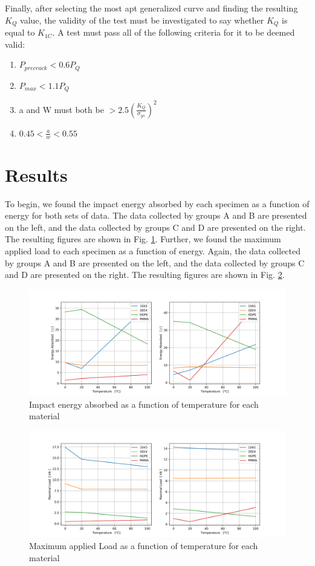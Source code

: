 \documentclass{article}
\begin{document}
Finally, after selecting the most apt generalized curve and finding the resulting $K_Q$ value, the validity of the test must be investigated to say whether $K_Q$ is equal to $K_{1C}$. A test must pass all of the following criteria for it to be deemed valid:

\begin{enumerate}
\label{enum:constraints}
    \item $P_{precrack} < 0.6 P_Q$
    \item $P_{max} < 1.1 P_Q$
    \item a and W must both be $> 2.5 \left(\frac{K_Q}{\sigma_{ys}}\right)^2$
    \item $0.45 < \frac{a}{w} < 0.55$
\end{enumerate}
\newpage
\section{Results}
To begin, we found the impact energy absorbed by each specimen as a function of energy for both sets of data. The data collected by groups A and B are presented on the left, and the data collected by groups C and D are presented on the right. The resulting figures are shown in Fig. \ref{fig:q1e}. Further, we found the maximum applied load to each specimen as a function of energy. Again, the data collected by groups A and B are presented on the left, and the data collected by groups C and D are presented on the right. The resulting figures are shown in Fig. \ref{fig:q1l}.

\begin{figure}[!h!]
    \centering
    \includegraphics[width=\linewidth]{plots/q1_energy.png}
    \caption{Impact energy absorbed as a function of temperature for each material}
    \label{fig:q1e}
\end{figure}

\begin{figure}[!h!]
    \centering
    \includegraphics[width=\linewidth]{plots/q1_load.png}
    \caption{Maximum applied Load as a function of temperature for each material}
    \label{fig:q1l}
\end{figure}
\end{document}
